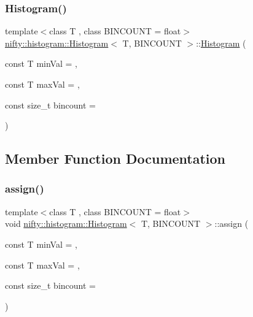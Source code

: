 \subsubsection{\texorpdfstring{Histogram()}{Histogram()}}
{\footnotesize\ttfamily template$<$class T , class B\+I\+N\+C\+O\+U\+NT  = float$>$ \\
\hyperlink{classnifty_1_1histogram_1_1Histogram}{nifty\+::histogram\+::\+Histogram}$<$ T, B\+I\+N\+C\+O\+U\+NT $>$\+::\hyperlink{classnifty_1_1histogram_1_1Histogram}{Histogram} (\begin{DoxyParamCaption}\item[{const T}]{min\+Val = {},  }\item[{const T}]{max\+Val = {},  }\item[{const size\+\_\+t}]{bincount = {} }\end{DoxyParamCaption})\hspace{0.3cm}{\ttfamily [inline]}}



\subsection{Member Function Documentation}
\mbox{\label{classnifty_1_1histogram_1_1Histogram_a5ced1f86011745189e73d686f65aad0a}} 
\subsubsection{\texorpdfstring{assign()}{assign()}}
{\footnotesize\ttfamily template$<$class T , class B\+I\+N\+C\+O\+U\+NT  = float$>$ \\
void \hyperlink{classnifty_1_1histogram_1_1Histogram}{nifty\+::histogram\+::\+Histogram}$<$ T, B\+I\+N\+C\+O\+U\+NT $>$\+::assign (\begin{DoxyParamCaption}\item[{const T}]{min\+Val = {},  }\item[{const T}]{max\+Val = {},  }\item[{const size\+\_\+t}]{bincount = {} }\end{DoxyParamCaption})\hspace{0.3cm}{\ttfamily [inline]}}


